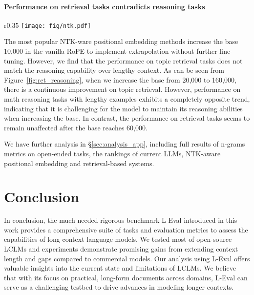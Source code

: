 \vspace{-1em}
\paragraph{Performance on retrieval tasks contradicts reasoning tasks}
\begin{wrapfigure}{r}{0.35\textwidth}
  \centering
  \vspace{-1mm}
  \texttt{[image: fig/ntk.pdf]}
  \caption{Test retrieval ability and reasoning ability with NTK base.}
  \label{fig:ret_reasoning}
  \vspace{-2mm}
\end{wrapfigure}
The most popular NTK-ware positional embedding methods increase the base 10,000 
in the vanilla RoPE to implement extrapolation without further fine-tuning. However, we find that the performance on topic retrieval tasks does not match the reasoning capability over lengthy context. As can be seen from Figure~\ref{fig:ret_reasoning}, when we increase the base from 20,000 to 160,000, there is a continuous improvement on topic retrieval. However, performance on math reasoning tasks with lengthy examples exhibits a completely opposite trend, indicating that it is challenging for the model to maintain its reasoning abilities when increasing the base. In contrast, the performance on retrieval tasks seems to remain unaffected after the base reaches 60,000.

We have further analysis in \S\ref{sec:analysis_app}, including full results of n-grams metrics on open-ended tasks, the rankings of current LLMs, NTK-aware positional embedding and retrieval-based systems.

\section{Conclusion}
In conclusion, the much-needed rigorous benchmark L-Eval introduced in this work provides a comprehensive suite of tasks and evaluation metrics to assess the capabilities of long context language models.
We tested most of open-source LCLMs and experiments demonstrate promising gains from extending context length and gaps compared to commercial models. Our analysis using L-Eval offers valuable insights into the current state and limitations of LCLMs. We believe that with its focus on practical, long-form documents across domains, L-Eval can serve as a challenging testbed to drive advances in modeling longer contexts.

\newpage

